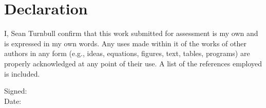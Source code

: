 \chapter*{Declaration}

I, Sean Turnbull confirm that this work submitted for assessment is my own and is expressed in
my own words. Any uses made within it of the works of other authors in any form (e.g.,
ideas, equations, figures, text, tables, programs) are properly acknowledged at any point of
their use. A list of the references employed is included.
\newline

\noindent
Signed: 
~\\[1cm]
Date: 